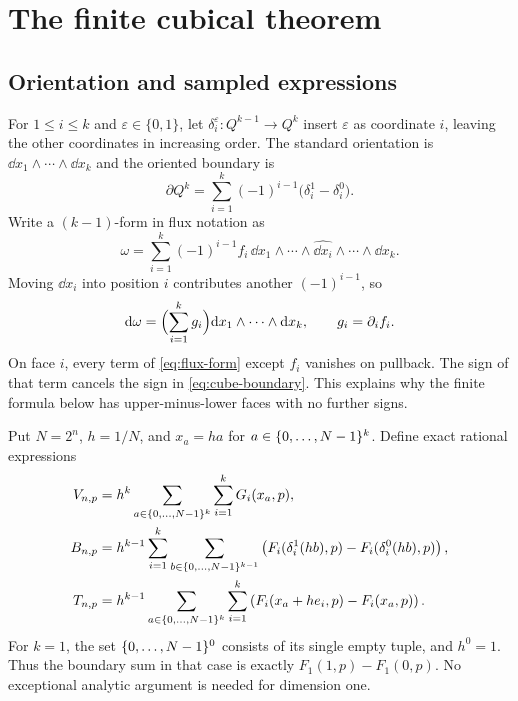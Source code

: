 \section{The finite cubical theorem}\label{sec:finite}

\subsection{Orientation and sampled expressions}

For $1\le i\le k$ and $\varepsilon\in\{0,1\}$, let
$\delta_i^\varepsilon:Q^{k-1}\to Q^k$ insert $\varepsilon$ as coordinate $i$,
leaving the other coordinates in increasing order. The standard orientation
is $\dd x_1\wedge\cdots\wedge\dd x_k$ and the oriented boundary is
\begin{equation}\label{eq:cube-boundary}
 \partial Q^k=\sum_{i=1}^k(-1)^{i-1}
       \bigl(\delta_i^1-\delta_i^0\bigr).
\end{equation}
Write a $(k-1)$-form in flux notation as
\begin{equation}\label{eq:flux-form}
 \omega=\sum_{i=1}^k(-1)^{i-1}f_i\,
  \dd x_1\wedge\cdots\wedge\widehat{\dd x_i}
                  \wedge\cdots\wedge\dd x_k .
\end{equation}
Moving $\dd x_i$ into position $i$ contributes another $(-1)^{i-1}$, so
\[
 \mathrm d\omega=\Bigl(\sum_{i=1}^kg_i\Bigr)
                    \mathrm d x_1\wedge\cdots\wedge\mathrm d x_k,
 \qquad g_i=\partial_i f_i.
\]
On face $i$, every term of \eqref{eq:flux-form} except $f_i$ vanishes on
pullback. The sign of that term cancels the sign in
\eqref{eq:cube-boundary}. This explains why the finite formula below has
upper-minus-lower faces with no further signs.

Put $N=2^n$, $h=1/N$, and $x_a=ha$ for
$a\in\{0,\ldots,N-1\}^{k}$. Define exact rational expressions
\begin{align}
 V_{n,p}
  &=h^k\sum_{a\in\{0,\ldots,N-1\}^{k}}\sum_{i=1}^kG_i(x_a,p),
       \label{eq:V}\\
 B_{n,p}
  &=h^{k-1}\sum_{i=1}^k\sum_{b\in\{0,\ldots,N-1\}^{k-1}}
    \left(F_i(\delta_i^1(hb),p)-F_i(\delta_i^0(hb),p)\right),
       \label{eq:B}\\
 T_{n,p}
  &=h^{k-1}\sum_{a\in\{0,\ldots,N-1\}^{k}}\sum_{i=1}^k
       \left(F_i(x_a+he_i,p)-F_i(x_a,p)\right).
       \label{eq:T}
\end{align}
For $k=1$, the set $\{0,\ldots,N-1\}^{0}$ consists of its single empty tuple, and
$h^0=1$. Thus the boundary sum in that case is exactly $F_1(1,p)-F_1(0,p)$.
No exceptional analytic argument is needed for dimension one.

